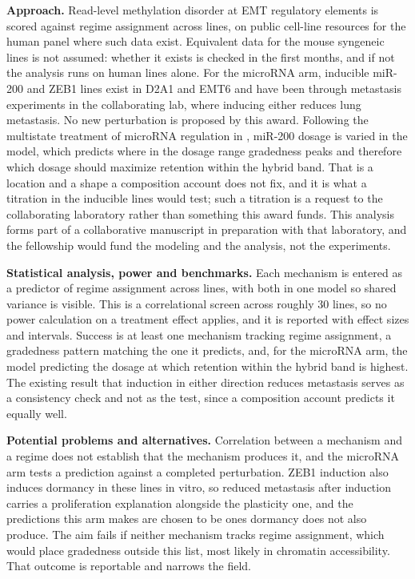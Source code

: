 \documentclass[12pt,letterpaper]{article}
\newcommand{\chg}[1]{\textcolor{chgcolor}{#1}}
\newcommand{\chg}[1]{#1}
\newcommand{\lead}[1]{\textbf{#1}}
\begin{document}
\lead{Approach.} Read-level methylation disorder at EMT regulatory elements is scored against regime assignment across lines, on public cell-line resources for the human panel where such data exist. Equivalent data for the mouse syngeneic lines is not assumed: whether it exists is checked in the first months, and if not the analysis runs on human lines alone. For the microRNA arm, inducible miR-200 and ZEB1 lines exist in D2A1 and EMT6 and have been through metastasis experiments in the collaborating lab, \chg{where inducing either reduces lung metastasis}. No new perturbation is proposed\chg{ by this award}. \chg{Following the multistate treatment of microRNA regulation in \cite{lu2013}, miR-200 dosage is varied in the model, which predicts where in the dosage range gradedness peaks and therefore which dosage should maximize retention within the hybrid band. That is a location and a shape a composition account does not fix, and it is what a titration in the inducible lines would test; such a titration is a request to the collaborating laboratory rather than something this award funds.} This analysis forms part of a collaborative manuscript in preparation with that laboratory, and the fellowship would fund the modeling and the analysis, not the experiments.

\lead{Statistical analysis, power and benchmarks.} Each mechanism is entered as a predictor of regime assignment across lines, with both in one model so shared variance is visible. This is a correlational screen across roughly 30 lines, so no power calculation on a treatment effect applies, and it is reported with effect sizes and intervals. Success is at least one mechanism tracking regime assignment, a gradedness pattern matching the one it predicts, and, for the microRNA arm, \chg{the model predicting the dosage at which retention within the hybrid band is highest. The existing result that induction in either direction reduces metastasis serves as a consistency check and not as the test, since a composition account predicts it equally well.}

\lead{Potential problems and alternatives.} Correlation between a mechanism and a regime does not establish that the mechanism produces it, and the microRNA arm tests a prediction against a completed perturbation. \chg{ZEB1 induction also induces dormancy in these lines in vitro, so reduced metastasis after induction carries a proliferation explanation alongside the plasticity one, and the predictions this arm makes are chosen to be ones dormancy does not also produce.} The aim fails if neither mechanism tracks regime assignment, which would place gradedness outside this list, most likely in chromatin accessibility. That outcome is reportable and narrows the field.
\end{document}
